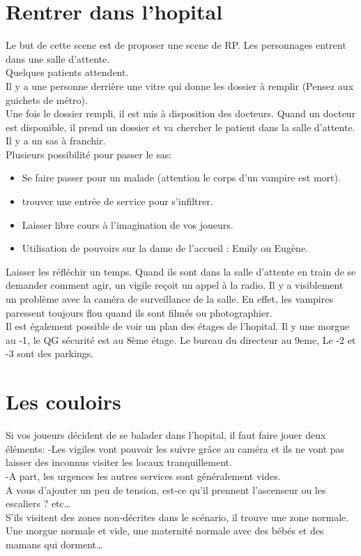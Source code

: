 \documentclass[oneside,12pt]{book}
\begin{document}
\begin{flushleft}
\section{Rentrer dans l'hopital}
Le but de cette scene est de proposer une scene de RP. Les personnages entrent dans une salle d'attente.\\ 
Quelques patients attendent.\\
Il y a une personne derrière une vitre qui donne les dossier à remplir (Pensez aux guichets de métro). \\
Une fois le dossier rempli, il est mis à disposition des docteurs. Quand un docteur est disponible, il prend un dossier et va chercher le patient dans la salle d'attente. Il y a un sas à franchir. \\
\vspace{0.5cm}
Plusieurs possibilité pour passer le sas:\\
\begin{itemize}
\item Se faire passer pour un malade (attention le corps d'un vampire est mort).\\
\item trouver une entrée de service pour s'infiltrer.\\
\item Laisser libre cours à l'imagination de vos joueurs.\\
\item Utilisation de pouvoirs sur la dame de l'accueil : Emily ou Eugène.
\end{itemize}

\vspace{0.5cm}
Laisser les réfléchir un temps. Quand ils sont dans la salle d'attente en train de se demander comment agir, un vigile reçoit un appel à la radio. Il y a visiblement un problème avec la caméra de surveillance de la salle. En effet, les vampires paressent toujours flou quand ils sont filmés ou photographier. \\
Il est également possible de voir un plan des étages de l'hopital. Il y une morgue au -1, le QG sécurité est au 8ème étage. Le bureau du directeur au 9eme, Le -2 et -3 sont des parkings. \\
\vspace{0.5cm}

\section{Les couloirs}
Si vos joueurs décident de se balader dans l'hopital, il faut faire jouer deux éléments:
-Les vigiles vont pouvoir les suivre grâce au caméra et ils ne vont pas laisser des inconnus visiter les locaux tranquillement.\\
-A part, les urgences les autres services sont généralement vides.\\
\vspace{0.5cm}
A vous d'ajouter un peu de tension, est-ce qu'il prennent l'ascenseur ou les escaliers ? etc…\\
S'ils visitent des zones non-décrites dans le scénario, il trouve une zone normale. Une morgue normale et vide, une maternité normale avec des bébés et des mamans qui dorment…


\end{flushleft}
\end{document}
